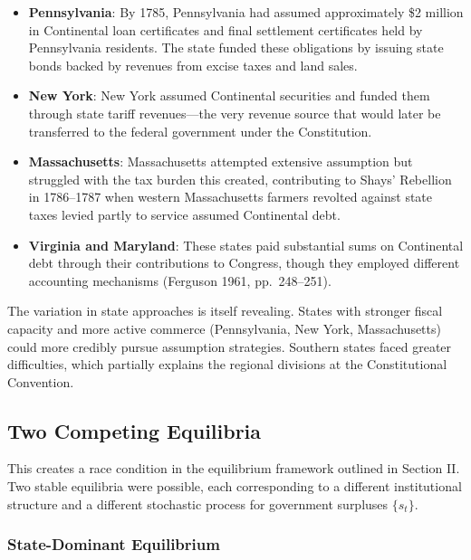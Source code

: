 \documentclass[12pt]{article}
\begin{document}
\begin{itemize}
\item \textbf{Pennsylvania}: By 1785, Pennsylvania had assumed approximately \$2 million in Continental loan certificates and final settlement certificates held by Pennsylvania residents. The state funded these obligations by issuing state bonds backed by revenues from excise taxes and land sales.

\item \textbf{New York}: New York assumed Continental securities and funded them through state tariff revenues---the very revenue source that would later be transferred to the federal government under the Constitution.

\item \textbf{Massachusetts}: Massachusetts attempted extensive assumption but struggled with the tax burden this created, contributing to Shays' Rebellion in 1786--1787 when western Massachusetts farmers revolted against state taxes levied partly to service assumed Continental debt.

\item \textbf{Virginia and Maryland}: These states paid substantial sums on Continental debt through their contributions to Congress, though they employed different accounting mechanisms (Ferguson 1961, pp.~248--251).
\end{itemize}

The variation in state approaches is itself revealing. States with stronger fiscal capacity and more active commerce (Pennsylvania, New York, Massachusetts) could more credibly pursue assumption strategies. Southern states faced greater difficulties, which partially explains the regional divisions at the Constitutional Convention.

\subsection{Two Competing Equilibria}

This creates a race condition in the equilibrium framework outlined in Section II. Two stable equilibria were possible, each corresponding to a different institutional structure and a different stochastic process for government surpluses $\{s_t\}$.

\subsubsection{State-Dominant Equilibrium}
\end{document}
